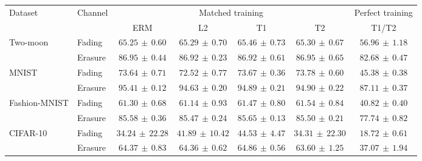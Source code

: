 \begin{tabular*}{\linewidth}{@{\extracolsep{\fill}}llccccc@{}}
\toprule
\multirow{2}{*}{Dataset} & \multirow{2}{*}{Channel} & \multicolumn{4}{c}{Matched training} & Perfect training \\
\cmidrule(lr){3-6}\cmidrule(l){7-7}
 & & ERM & L2 & T1 & T2 & T1/T2 \\
\midrule
\multirow{2}{*}{Two-moon} & Fading & $65.25\,\pm\,0.60$ & $65.29\,\pm\,0.70$ & $\mathbf{65.46}\,\pm\,0.73$ & $65.30\,\pm\,0.67$ & $56.96\,\pm\,1.18$ \\
 & Erasure & $86.95\,\pm\,0.44$ & $86.92\,\pm\,0.23$ & $86.92\,\pm\,0.61$ & $\mathbf{86.95}\,\pm\,0.65$ & $82.68\,\pm\,0.47$ \\
\midrule[0.25pt]
\multirow{2}{*}{MNIST} & Fading & $73.64\,\pm\,0.71$ & $72.52\,\pm\,0.77$ & $73.67\,\pm\,0.36$ & $\mathbf{73.78}\,\pm\,0.60$ & $45.38\,\pm\,0.38$ \\
 & Erasure & $\mathbf{95.41}\,\pm\,0.12$ & $94.63\,\pm\,0.20$ & $94.89\,\pm\,0.21$ & $94.90\,\pm\,0.22$ & $87.11\,\pm\,0.37$ \\
\midrule[0.25pt]
\multirow{2}{*}{Fashion-MNIST} & Fading & $61.30\,\pm\,0.68$ & $61.14\,\pm\,0.93$ & $61.47\,\pm\,0.80$ & $\mathbf{61.54}\,\pm\,0.84$ & $40.82\,\pm\,0.40$ \\
 & Erasure & $85.58\,\pm\,0.36$ & $85.47\,\pm\,0.24$ & $\mathbf{85.65}\,\pm\,0.13$ & $85.50\,\pm\,0.21$ & $77.74\,\pm\,0.82$ \\
\midrule[0.25pt]
\multirow{2}{*}{CIFAR-10} & Fading & $34.24\,\pm\,22.28$ & $41.89\,\pm\,10.42$ & $\mathbf{44.53}\,\pm\,4.47$ & $34.31\,\pm\,22.30$ & $18.72\,\pm\,0.61$ \\
 & Erasure & $64.37\,\pm\,0.83$ & $64.36\,\pm\,0.62$ & $\mathbf{64.86}\,\pm\,0.56$ & $63.60\,\pm\,1.25$ & $37.07\,\pm\,1.94$ \\
\bottomrule
\end{tabular*}
